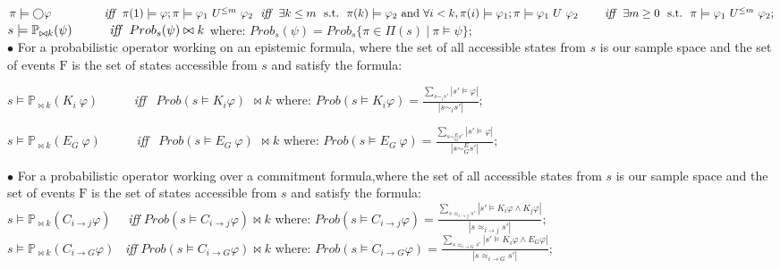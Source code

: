 \begin{definition}
\noindent $\pi \models \bigcirc \varphi~~~~~~~~~~~~~~\emph{iff}~~\pi(1) \models \varphi; \\
\pi \models \varphi_1~U^{\leq m}~\varphi_2~~\emph{iff}~~\exists k \leq m~~\textrm{s.t.}~~ \pi(k) \models \varphi_2 ~\textrm{and}~\forall i < k, \pi(i) \models \varphi_1;\\
\pi \models \varphi_1 ~U~\varphi_2~~~~~~~\emph{iff}~~\exists m \geq 0~~\textrm{s.t.}~~\pi \models \varphi_1~U^{\leq m}~\varphi_2;$\\
\noindent $s \models \mathbb{P}_{\bowtie k} (\psi)~~~~~~~~~\emph{iff}~~Prob_s(\psi)\bowtie k$ where: $Prob_s(\psi)=Prob_s\{\pi \in \Pi(s)~|~\pi\models
\psi\};$\\


\noindent $\bullet$ For a probabilistic operator working on an epistemic formula, where the set of all accessible states from $s$ is our sample space and the set of events $\mathrm{F}$ is the set of states accessible from $s$ and satisfy the formula:


\begin{tabbing}
\noindent $s\models \mathbb{P}_{\bowtie k}(K_i~\varphi) $
    \ \ \ \ \ \= \emph{iff} \ $Prob(s \models K_i\varphi)$ $\bowtie k$ where: $Prob(s\models K_i\varphi)=\frac{\sum_{s \sim_i s'}|s'\models \varphi| }{|s \sim_i s'|};$
\end{tabbing}

\begin{tabbing}
 \noindent $s\models \mathbb{P}_{\bowtie k}(E_G~\varphi) $
    \ \ \ \ \ \= \emph{iff} \ $Prob(s \models E_G~\varphi)$ $\bowtie k$ where: $Prob(s\models E_G~\varphi)=\frac{\sum_{s \sim_G^E s'}|s'\models \varphi| }{|s \sim_G^E s'|};$

\end{tabbing}


\noindent $\bullet$  For a probabilistic operator working over a commitment formula,where the set of all accessible states from $s$ is our sample space and the set of events $\mathrm{F}$ is the set of states accessible from $s$
and satisfy the formula: \\


\noindent $s\models \mathbb{P}_{\bowtie k}(C_{i\rightarrow j}\varphi)$
   ~~\emph{iff}  $Prob(s \models C_{i\rightarrow j}\varphi) \bowtie \!k$ where: $Prob(s\models C_{i\rightarrow j}\varphi)=\frac{\sum_{s \approx_{i \rightarrow j}s'}|s'\models K_i \varphi \wedge K_j \varphi| }{|s \approx_{i \rightarrow j}s'| };$\\

\noindent $s\models \mathbb{P}_{\bowtie k}(C_{i\rightarrow G}\varphi)$
   ~\emph{iff}  $Prob(s \models C_{i\rightarrow G}\varphi) \bowtie \!k$ where: $Prob(s\models C_{i\rightarrow G}\varphi)=\frac{\sum_{s \approx_{i \rightarrow G}s'}|s'\models K_i \varphi \wedge E_G \varphi| }{|s \approx_{i \rightarrow G}s'| };$\\



\end{definition}
